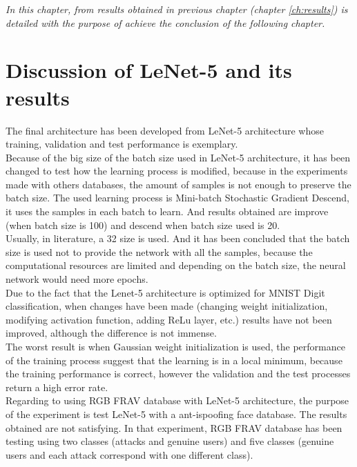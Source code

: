 \begin{small}
\emph{In this chapter, from results obtained in previous chapter (chapter \ref{ch:results}) is detailed with the purpose of achieve the conclusion of the following chapter.\\}
\end{small}

\section{Discussion of LeNet-5 and its results}
The final architecture has been developed from LeNet-5 architecture whose training, validation and test performance is exemplary.\\

Because of the big size of the batch size used in LeNet-5 architecture, it has been changed to test how the learning process is modified, because in the experiments made with others databases, the amount of samples is not enough to preserve the batch size. The used learning process is Mini-batch Stochastic Gradient Descend, it uses the samples in each batch to learn. And results obtained are improve (when batch size is 100) and descend when batch size used is 20. \\

Usually, in literature, a 32 size is used. And it has been concluded that the batch size is used not to provide the network with all the samples, because the computational resources are limited and depending on the batch size, the neural network would need more epochs.\\

Due to the fact that the Lenet-5 architecture is optimized for MNIST Digit classification, when changes have been made (changing weight initialization, modifying activation function, adding ReLu layer, etc.) results have not been improved, although the difference is not immense.\\

The worst result is when Gaussian weight initialization is used, the performance of the training process suggest that the learning is in a local minimum, because the training performance is correct, however the validation  and the test processes return a high error rate.\\

Regarding to using RGB FRAV database with LeNet-5 architecture, the purpose of the experiment is test LeNet-5 with a ant-ispoofing face database. The  results obtained are not satisfying. In that experiment, RGB FRAV database has been testing using two classes (attacks and genuine users) and five classes (genuine users and each attack correspond with one different class).\\

